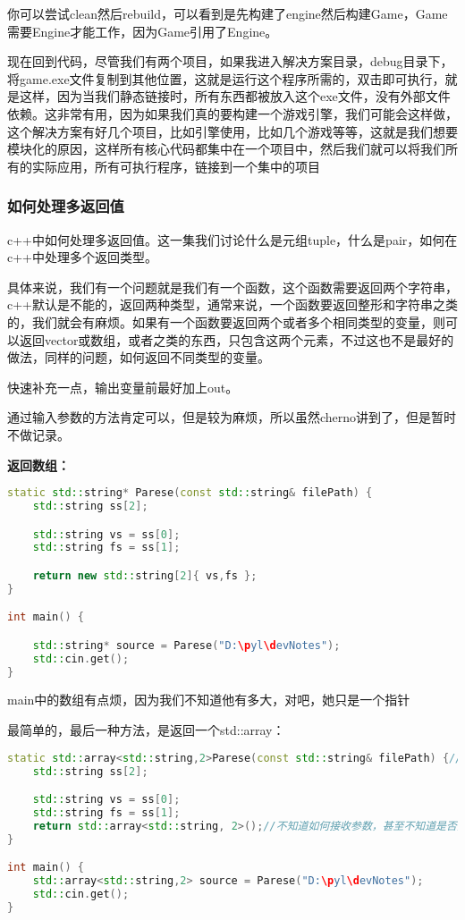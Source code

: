 你可以尝试clean然后rebuild，可以看到是先构建了engine然后构建Game，Game需要Engine才能工作，因为Game引用了Engine。

现在回到代码，尽管我们有两个项目，如果我进入解决方案目录，debug目录下，将game.exe文件复制到其他位置，这就是运行这个程序所需的，双击即可执行，就是这样，因为当我们静态链接时，所有东西都被放入这个exe文件，没有外部文件依赖。这非常有用，因为如果我们真的要构建一个游戏引擎，我们可能会这样做，这个解决方案有好几个项目，比如引擎使用，比如几个游戏等等，这就是我们想要模块化的原因，这样所有核心代码都集中在一个项目中，然后我们就可以将我们所有的实际应用，所有可执行程序，链接到一个集中的项目

\subsubsection{如何处理多返回值}

c++中如何处理多返回值。这一集我们讨论什么是元组tuple，什么是pair，如何在c++中处理多个返回类型。

具体来说，我们有一个问题就是我们有一个函数，这个函数需要返回两个字符串，c++默认是不能的，返回两种类型，通常来说，一个函数要返回整形和字符串之类的，我们就会有麻烦。如果有一个函数要返回两个或者多个相同类型的变量，则可以返回vector或数组，或者之类的东西，只包含这两个元素，不过这也不是最好的做法，同样的问题，如何返回不同类型的变量。

快速补充一点，输出变量前最好加上out。

通过输入参数的方法肯定可以，但是较为麻烦，所以虽然cherno讲到了，但是暂时不做记录。

\textbf{返回数组：}

\begin{lstlisting}[language=c++]
static std::string* Parese(const std::string& filePath) {
    std::string ss[2];

    std::string vs = ss[0];
    std::string fs = ss[1];

    return new std::string[2]{ vs,fs };
}

int main() {

    std::string* source = Parese("D:\pyl\devNotes");
    std::cin.get();
}
\end{lstlisting}

main中的数组有点烦，因为我们不知道他有多大，对吧，她只是一个指针

最简单的，最后一种方法，是返回一个{\ncodestyle std::array}：

\begin{lstlisting}[language=c++]
static std::array<std::string,2>Parese(const std::string& filePath) {//类型为string，大小为2
    std::string ss[2];

    std::string vs = ss[0];
    std::string fs = ss[1];
    return std::array<std::string, 2>();//不知道如何接收参数，甚至不知道是否接收参数
}

int main() {
    std::array<std::string,2> source = Parese("D:\pyl\devNotes");
    std::cin.get();
}
\end{lstlisting}

